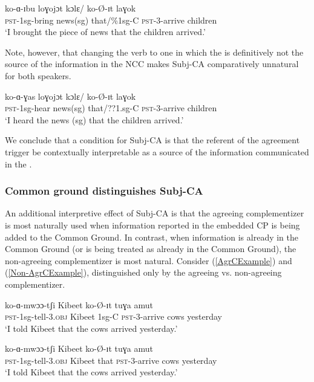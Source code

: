 \documentclass[output=paper
,newtxmath
,modfonts
,nonflat]{langsci/langscibook}
\begin{document}
\ea
\gll ko-ɑ-ɪbu loɣojɔt kɔlɛ/ ko-\O-ɪt laɣok \\
\textsc{pst}-1sg-bring news(sg) that/\%1sg-C \textsc{pst}-3-arrive children \\
\glt `I brought the piece of news that the children arrived.'
\z

\noindent Note, however, that changing the verb to one in which the  is definitively not the source of the information in the NCC makes Subj-CA comparatively unnatural for both speakers. 

\ea
\gll ko-ɑ-ɣas loɣojɔt kɔlɛ/ ko-\O-ɪt laɣok \\
\textsc{pst}-1sg-hear news(sg) that/??1.sg-C \textsc{pst}-3-arrive children \\
\glt `I heard the news (sg) that the children arrived.'
\z

\noindent We conclude that a condition for Subj-CA is that the referent of the agreement trigger be contextually interpretable as a source of the information communicated in the . 

\subsubsection{Common ground distinguishes Subj-CA}

An additional interpretive effect of Subj-CA is that the agreeing complementizer is most naturally used when information reported in the embedded CP is being added to the Common Ground. In contrast, when information is already in the Common Ground (or is being treated as already in the Common Ground), the non-agreeing complementizer is most natural. Consider (\ref{AgrCExample}) and (\ref{Non-AgrCExample}), distinguished only by the agreeing vs. non-agreeing complementizer. 

\ea
\settowidth{}
\begin{xlist}

\ex \label{AgrCExample}
\gll ko-ɑ-mwɔɔ-tʃi Kibeet  ko-\O-ɪt tuɣa amut \\ 
\textsc{pst}-1sg-tell-3.\textsc{obj} Kibeet 1sg-C \textsc{pst}-3-arrive cows yesterday \\ %
\glt `I told Kibeet that the cows arrived yesterday.'

\ex \label{Non-AgrCExample}
\gll ko-ɑ-mwɔɔ-tʃi Kibeet  ko-\O-ɪt tuɣa amut \\ 
\textsc{pst}-1sg-tell-3.\textsc{obj} Kibeet that \textsc{pst}-3-arrive cows yesterday \\ %
\glt `I told Kibeet that the cows arrived yesterday.'

\end{xlist}
\z
\end{document}
